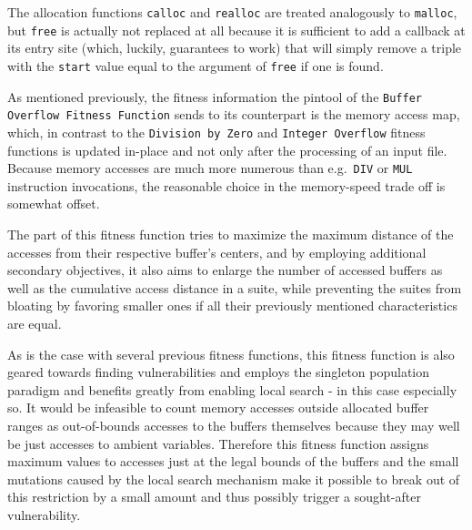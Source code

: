 The allocation functions \texttt{calloc} and \texttt{realloc} are treated analogously to \texttt{malloc}, but
\texttt{free} is actually not replaced at all because it is sufficient to add a callback at its entry site
(which, luckily, \pin guarantees to work) that will simply remove a triple with the \texttt{start} value equal
to the argument of \texttt{free} if one is found.

As mentioned previously, the fitness information the pintool of the \texttt{Buffer Overflow
Fitness Function} sends to its \java counterpart is the memory access map, which, in contrast to the
\texttt{Division by Zero} and \texttt{Integer Overflow} fitness functions is updated in-place and not only
after the processing of an input file. Because memory accesses are much more numerous than e.g.\ \texttt{DIV}
or \texttt{MUL} instruction invocations, the reasonable choice in the memory-speed trade off is somewhat offset.

The \java part of this fitness function tries to maximize the maximum distance of the accesses from their
respective buffer's centers, and by employing additional secondary objectives, it also aims to enlarge the
number of accessed buffers as well as the cumulative access distance in a suite, while preventing the suites
from bloating by favoring smaller ones if all their previously mentioned characteristics are equal.

As is the case with several previous fitness functions, this fitness function is also geared towards finding
vulnerabilities and employs the singleton population paradigm and benefits greatly from enabling local search -
in this case especially so. It would be infeasible to count memory accesses outside allocated buffer ranges as
out-of-bounds accesses to the buffers themselves because they may well be just accesses to ambient variables.
Therefore this fitness function assigns maximum values to accesses just at the legal bounds of the buffers and
the small mutations caused by the local search mechanism make it possible to break out of this restriction
by a small amount and thus possibly trigger a sought-after vulnerability.
